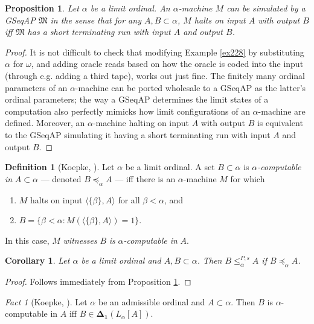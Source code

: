 \documentclass[12pt, twoside]{memoir}
\numberwithin{equation}{section}
\newtheorem{prop}[thm]{Proposition}
\newtheorem{cor}[thm]{Corollary}
\theoremstyle{definition}
\newtheorem{defi}[thm]{Definition}
\theoremstyle{remark}
\newtheorem{fact}[thm]{Fact}
\theoremstyle{definition}
\theoremstyle{definition}
\theoremstyle{definition}
\theoremstyle{remark}
\begin{document}
\begin{prop}\label{prop270}
Let $\alpha$ be a limit ordinal. An $\alpha$-machine $M$ can be simulated by a GSeqAP $\mathfrak{M}$ in the sense that for any $A, B \subset \alpha$, $M$ halts on input $A$ with output $B$ iff $\mathfrak{M}$ has a short terminating run with input $A$ and output $B$.
\end{prop}

\begin{proof}
It is not difficult to check that modifying Example \ref{ex228} by substituting $\alpha$ for $\omega$, and adding oracle reads based on how the oracle is coded into the input (through e.g. adding a third tape), works out just fine. The finitely many ordinal parameters of an $\alpha$-machine can be ported wholesale to a GSeqAP as the latter's ordinal parameters; the way a GSeqAP determines the limit states of a computation also perfectly mimicks how limit configurations of an $\alpha$-machine are defined. Moreover, an $\alpha$-machine halting on input $A$ with output $B$ is equivalent to the GSeqAP simulating it having a short terminating run with input $A$ and output $B$.
\end{proof}

\begin{defi}[Koepke, \cite{koepke2}]
Let $\alpha$ be a limit ordinal. A set $B \subset \alpha$ is $\alpha$\emph{-computable in} $A \subset \alpha$ --- denoted $B \preceq_{\alpha} A$ --- iff there is an $\alpha$-machine $M$ for which
\begin{enumerate}[label=(\alph*)]
    \item $M$ halts on input $\langle \{\beta\}, A \rangle$ for all $\beta < \alpha$, and
    \item $B = \{\beta < \alpha : M(\langle \{\beta\}, A \rangle) = 1\}$.
\end{enumerate}
In this case, $M$ \emph{witnesses} $B$ \emph{is} $\alpha$\emph{-computable in} $A$.
\end{defi}

\begin{cor}\label{cor334}
Let $\alpha$ be a limit ordinal and $A, B \subset \alpha$. Then $B \leq^{P, s}_{\alpha} A$ if $B \preceq_{\alpha} A$.
\end{cor}

\begin{proof}
Follows immediately from Proposition \ref{prop270}.
\end{proof}

\begin{fact}[Koepke, \cite{koepke2}]\label{fact334}
Let $\alpha$ be an admissible ordinal and $A \subset \alpha$. Then $B$ is $\alpha$-computable in $A$ iff $B \in \mathbf{\Delta_1}(L_{\alpha}[A])$.
\end{fact}
\end{document}
